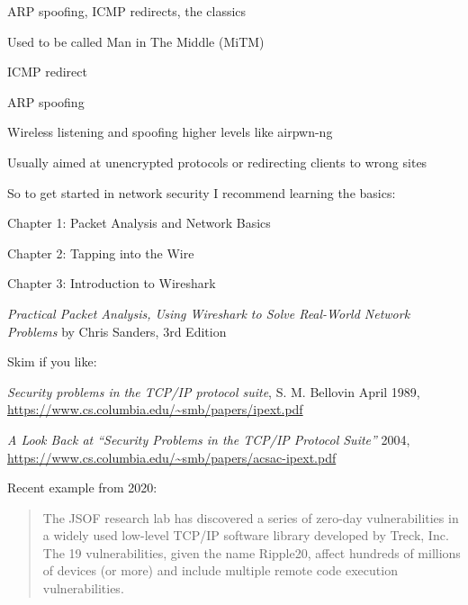 \documentclass[Screen16to9,17pt]{foils}
\begin{document}

\begin{list1}
\item ARP spoofing, ICMP redirects, the classics
\item Used to be called Man in The Middle (MiTM)
\begin{list2}
\item ICMP redirect
\item ARP spoofing
\item Wireless listening and spoofing higher levels like  airpwn-ng 
\end{list2}
\item Usually aimed at unencrypted protocols or redirecting clients to wrong sites
\end{list1}



So to get started in network security I recommend learning the basics:
\begin{list2}
\item Chapter 1: Packet Analysis and Network Basics
\item Chapter 2: Tapping into the Wire
\item Chapter 3: Introduction to Wireshark
\end{list2}
\emph{Practical Packet Analysis,
Using Wireshark to Solve Real-World Network Problems}
by Chris Sanders, 3rd Edition




Skim if you like:

\begin{list2}
\item
\emph{Security problems in the TCP/IP protocol suite}, S. M. Bellovin April 1989,\\
 \url{https://www.cs.columbia.edu/~smb/papers/ipext.pdf}
\item \emph{A Look Back at “Security Problems in the TCP/IP Protocol Suite”} 2004,\\
 \url{https://www.cs.columbia.edu/~smb/papers/acsac-ipext.pdf}
\end{list2}




Recent example from 2020:
\begin{quote}
The JSOF research lab has discovered a series of zero-day vulnerabilities in a widely used low-level TCP/IP software library developed by Treck, Inc. The 19 vulnerabilities, given the name Ripple20, affect hundreds of millions of devices (or more) and include multiple remote code execution vulnerabilities.
\end{quote}
\end{document}
